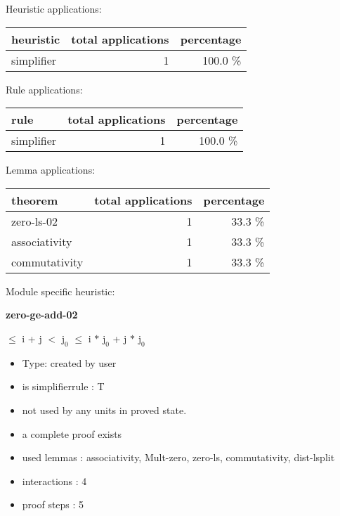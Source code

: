 \documentclass[a4paper]{article}
\begin{document}
\medskip


Heuristic applications:

\begin{supertabular}{l|r|r}
heuristic	& total applications & percentage \\ \hline
simplifier & 1 & 100.0 \% \\

\end{supertabular}

Rule applications:

\begin{supertabular}{l|r|r}
rule	        & total applications & percentage \\ \hline
simplifier & 1 & 100.0 \% \\

\end{supertabular}

Lemma applications:

\begin{supertabular}{l|r|r}
theorem	        & total applications & percentage \\ \hline
zero-ls-02 & 1 & 33.3 \% \\
associativity & 1 & 33.3 \% \\
commutativity & 1 & 33.3 \% \\

\end{supertabular}

Module specific heuristic:

\pagebreak

{\LARGE\bf zero-ge-add-02}\label{lemma-zero-ge-add-02}

\medskip

  $\le$ i + j  $<$ $\mbox{j}_{0}$  $\le$ i $*$ $\mbox{j}_{0}$ + j $*$ $\mbox{j}_{0}$

\begin{itemize}

\item Type: created by user

\item is simplifierrule : T
\item not used by any units in proved state.
\item       a complete proof exists
\item       used lemmas  : associativity, Mult-zero, zero-ls, commutativity, dist-lsplit
\item       interactions : 4
\item       proof steps  : 5
\end{itemize}
\end{document}
